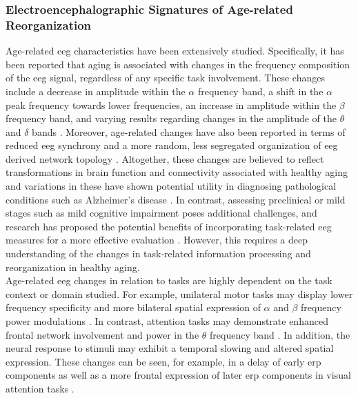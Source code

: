 \subsubsection{Electroencephalographic Signatures of Age-related Reorganization}
Age-related \gls{eeg} characteristics have been extensively studied. Specifically, it has been reported that aging is associated with changes in the frequency composition of the \gls{eeg} signal, regardless of any specific task involvement. These changes include a decrease in amplitude within the $\alpha$ frequency band, a shift in the $\alpha$ peak frequency towards lower frequencies, an increase in amplitude within the $\beta$ frequency band, and varying results regarding changes in the amplitude of the $\theta$ and $\delta$ bands \cite{Rossini2007, Ishii2017, Courtney2021}. Moreover, age-related changes have also been reported in terms of reduced \gls{eeg} synchrony and a more random, less segregated organization of \gls{eeg} derived network topology \cite{Smit2012, Samogin2022}. Altogether, these changes are believed to reflect transformations in brain function and connectivity associated with healthy aging and variations in these have shown potential utility in diagnosing pathological conditions such as Alzheimer's disease \cite{Babiloni2021}. In contrast, assessing preclinical or mild stages such as mild cognitive impairment poses additional challenges, and research has proposed the potential benefits of incorporating task-related \gls{eeg} measures for a more effective evaluation \cite{Froehlich2021, Farina2020}. However, this requires a deep understanding of the changes in task-related information processing and reorganization in healthy aging.\\
Age-related \gls{eeg} changes in relation to tasks are highly dependent on the task context or domain studied. For example, unilateral motor tasks may display lower frequency specificity and more bilateral spatial expression of $\alpha$ and $\beta$ frequency power modulations \cite{Quandt2016}. In contrast, attention tasks may demonstrate enhanced frontal network involvement and power in the $\theta$ frequency band \cite{Hong2016}. In addition, the neural response to stimuli may exhibit a temporal slowing and altered spatial expression. These changes can be seen, for example, in a delay of early \gls{erp} components as well as a more frontal expression of later \gls{erp} components in visual attention tasks \cite{Li2013, Reuter2017}.\\
